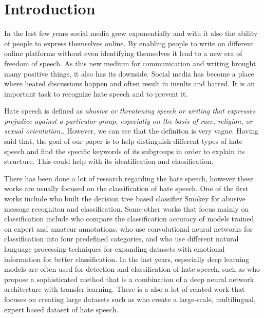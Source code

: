 \documentclass[fleqn,moreauthors,10pt]{ds_report}
\affiliation{\textit{Advisors: Slavko Žitnik}}
\begin{document}
\flushbottom 

\maketitle 

\thispagestyle{empty} 


\section*{Introduction}
In the last few years social media grew exponentially and with it also the ability of people to express themselves online. By enabling people to write on different online platforms without even identifying themselves it lead to a new era of freedom of speech. As this new medium for communication and writing brought many positive things, it also has its downside. Social media has become a place where heated discussions happen and often result in insults and hatred. It is an important task to recognize hate speech and to prevent it.

Hate speech is defined as \textit{abusive or threatening speech or writing that expresses prejudice against a particular group, especially on the basis of race, religion, or sexual orientation.}\cite{hate_speech}. However, we can see that the definiton is very vague. Having said that, the goal of our paper is to help distinguish different types of hate speech and find the specific keywords of its subgroups in order to explain its structure. This could help with its identification and classification. 

There has been done a lot of research regarding the hate speech, however these works are usually focused on the classification of hate speech. One of the first works include \cite{spertus1997smokey} who built the decision tree based classifier Smokey for abusive message recogniton and classification. Some other works that focus mainly on classification include \cite{waseem2016you} who compare the classification accuracy of models trained on expert and amateur annotations, \cite{gamback2017using} who use convolutional neural networks for classification into four predefined categories, and \cite{martins2018hate} who use different natural language processing techniques for expanding datasets with emotional information for better classification. In the last years, especially deep learning models are often used for detection and classification of hate speech, such as \cite{rizoiu2019transfer} who propose a sophisticated method that is a combination of a deep neural network architecture with transfer learning.
There is a also a lot of related work that focuses on creating large datasets such as \cite{chung2019conan} who create a large-scale, multilingual, expert based dataset of hate speech. 
\end{document}
